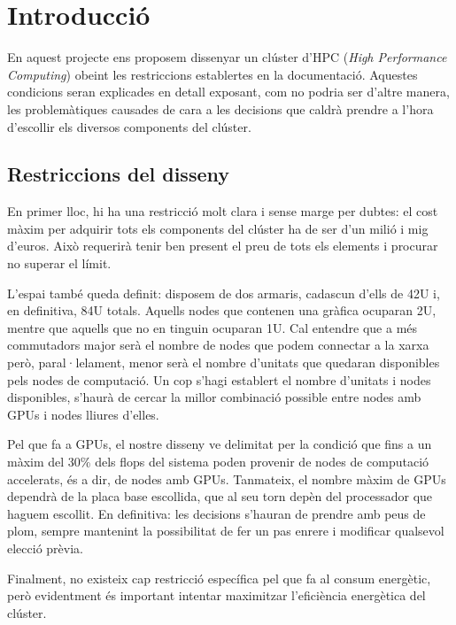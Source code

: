 \section{Introducció}

En aquest projecte ens proposem dissenyar un clúster d'HPC (\textit{High Performance Computing}) obeint les restriccions establertes en la documentació. Aquestes condicions seran explicades en detall exposant, com no podria ser d'altre manera, les problemàtiques causades de cara a les decisions que caldrà prendre a l'hora d'escollir els diversos components del clúster.

\subsection{Restriccions del disseny}
En primer lloc, hi ha una restricció molt clara i sense marge per dubtes: el cost màxim per adquirir tots els components del clúster ha de ser d'un milió i mig d'euros. Això requerirà tenir ben present el preu de tots els elements i procurar no superar el límit.

L'espai també queda definit: disposem de dos armaris, cadascun d'ells de 42U i, en definitiva, 84U totals. Aquells nodes que contenen una gràfica ocuparan 2U, mentre que aquells que no en tinguin ocuparan 1U. Cal entendre que a més commutadors major serà el nombre de nodes que podem connectar a la xarxa però, paral·lelament, menor serà el nombre d'unitats que quedaran disponibles pels nodes de computació. Un cop s'hagi establert el nombre d'unitats i nodes disponibles, s'haurà de cercar la millor combinació possible entre nodes amb GPUs i nodes lliures d'elles.

Pel que fa a GPUs, el nostre disseny ve delimitat per la condició que fins a un màxim del 30\% dels flops del sistema poden provenir de nodes de computació accelerats, és a dir, de nodes amb GPUs. Tanmateix, el nombre màxim de GPUs dependrà de la placa base escollida, que al seu torn depèn del processador que haguem escollit. En definitiva: les decisions s'hauran de prendre amb peus de plom, sempre mantenint la possibilitat de fer un pas enrere i modificar qualsevol elecció prèvia.

Finalment, no existeix cap restricció específica pel que fa al consum energètic, però evidentment és important intentar maximitzar l'eficiència energètica del clúster. 


